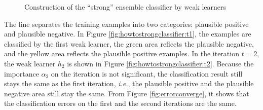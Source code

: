 \begin{figure}
\begin{center}
\caption{Construction of the ``strong'' ensemble classifier by weak learners}
\label{fig:howtostrongclassifier}
\end{center}
\end{figure} 
The line separates the training examples into two categories: plausible positive and plausible negative. In \mbox{Figure} \ref{fig:howtostrongclassifier:t1}, the examples are classified by the first weak learner, the green area reflects the plausible negative, and the yellow area reflects the plausible positive examples. In the iteration $t=2$, the weak learner $h_{2}$ is shown in \mbox{Figure} \ref{fig:howtostrongclassifier:t2}. Because the importance $\alpha_{2}$ on the iteration is not significant, the classification result still stays the same as the first iteration, \textit{i.e.}, the plausible positive and the plausible negative area still stay the same. From \mbox{Figure} \ref{fig:errorconverge}, it shows that the classification errors on the first and the second iterations are the same. 
